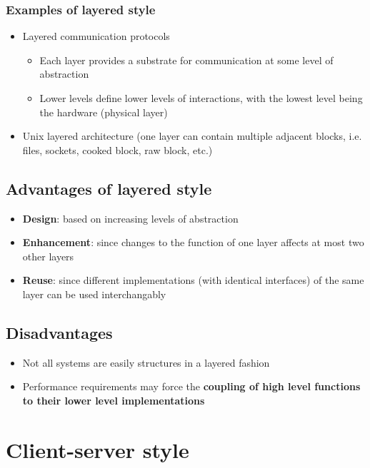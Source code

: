 \documentclass[12pt]{book}
\begin{document}
\subsection{Examples of layered style}
\begin{itemize}
    \item Layered communication protocols
    \begin{itemize}
        \item Each layer provides a substrate for communication at some level of abstraction
        \item Lower levels define lower levels of interactions, with the lowest level being the hardware (physical layer)
    \end{itemize} 
    
    \item Unix layered architecture (one layer can contain multiple adjacent blocks, i.e. files, sockets, cooked block, raw block, etc.)
\end{itemize}

\section{Advantages of layered style}
\begin{itemize}
    \item \textbf{Design}: based on increasing levels of abstraction
    \item \textbf{Enhancement}: since changes to the function of one layer affects at most two other layers
    \item \textbf{Reuse}: since different implementations (with identical interfaces) of the same layer can be used interchangably
\end{itemize}

\section{Disadvantages}
\begin{itemize}
    \item Not all systems are easily structures in a layered fashion
    \item Performance requirements may force the \textbf{coupling of high level functions to their lower level implementations}
\end{itemize}

\chapter{Client-server style}
\end{document}

